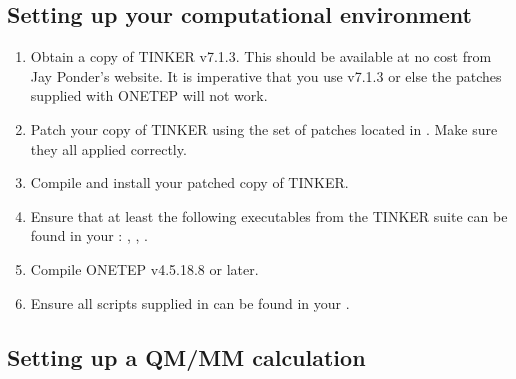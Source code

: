 \documentclass[letterpaper,10pt,english]{sphinxmanual}
\begin{document}
\subsection{Setting up your computational environment}
\label{\detokenize{tinktep:setting-up-your-computational-environment}}\begin{enumerate}
\item {} 
Obtain a copy of TINKER v7.1.3. This should be available at no cost
from Jay Ponder’s website. It is imperative that you use v7.1.3 or
else the patches supplied with ONETEP will not work.

\item {} 
Patch your copy of TINKER using the set of patches located in
. Make sure they all applied
correctly.

\item {} 
Compile and install your patched copy of TINKER.

\item {} 
Ensure that at least the following executables from the TINKER suite
can be found in your : , , .

\item {} 
Compile ONETEP v4.5.18.8 or later.

\item {} 
Ensure all scripts supplied in  can be found in your
.

\end{enumerate}


\subsection{Setting up a QM/MM calculation}
\label{\detokenize{tinktep:setting-up-a-qm-mm-calculation}}
\end{document}
